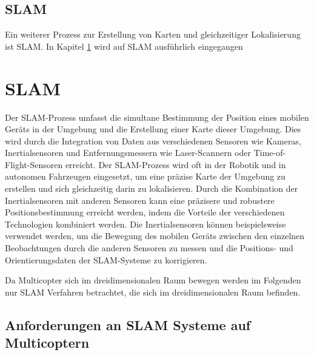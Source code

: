 \subsection{SLAM}

Ein weiterer Prozess zur Erstellung von Karten und gleichzeitiger Lokalisierung ist \ac{SLAM}. 
In Kapitel \ref{SLAM:section} wird auf \ac{SLAM} ausführlich eingegangen
\section{SLAM}\label{SLAM:section} 

Der SLAM-Prozess umfasst die simultane Bestimmung der Position eines mobilen Geräts in der Umgebung und die Erstellung einer Karte dieser Umgebung. Dies wird durch die Integration von Daten aus verschiedenen Sensoren wie Kameras, Inertialsensoren und Entfernungsmessern wie Laser-Scannern oder Time-of-Flight-Sensoren erreicht. Der SLAM-Prozess wird oft in der Robotik und in autonomen Fahrzeugen eingesetzt, um eine präzise Karte der Umgebung zu erstellen und sich gleichzeitig darin zu lokalisieren.
Durch die Kombination der Inertialsensoren mit anderen Sensoren kann eine präzisere und robustere Positionsbestimmung erreicht werden, indem die Vorteile der verschiedenen Technologien kombiniert werden. Die Inertialsensoren können beispielsweise verwendet werden, um die Bewegung des mobilen Geräts zwischen den einzelnen Beobachtungen durch die anderen Sensoren zu messen und die Positions- und Orientierungsdaten der SLAM-Systeme zu korrigieren.

Da Multicopter sich im dreidimensionalen Raum bewegen werden im Folgenden nur \ac{SLAM} Verfahren betrachtet, die sich im dreidimensionalen Raum befinden.

\subsection{Anforderungen an SLAM Systeme auf Multicoptern}


